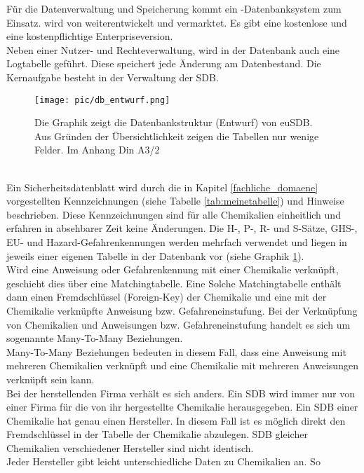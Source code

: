 Für die Datenverwaltung und Speicherung kommt ein -Datenbanksystem
zum Einsatz.  wird von  weiterentwickelt und vermarktet.
Es gibt eine kostenlose und eine kostenpflichtige
Enterpriseversion. \cite{ORACOR-2013}
\\
Neben einer Nutzer- und Rechteverwaltung, wird in der Datenbank auch eine
Logtabelle geführt. Diese speichert jede Änderung am Datenbestand. Die
Kernaufgabe besteht in der Verwaltung der \ac{SDB}.
\begin{figure}
  \centering
    \texttt{[image: pic/db\_entwurf.png]}
      \caption[Datenbankstruktur der Plattform euSDB]{Die Graphik zeigt die
      Datenbankstruktur (Entwurf) von euSDB.
      Aus Gründen der Übersichtlichkeit zeigen die Tabellen nur wenige Felder. Im Anhang Din A3/2}
      \label{fig:db_entwurf}
\end{figure}
\\
Ein Sicherheitsdatenblatt wird durch die in Kapitel \ref{fachliche_domaene}
vorgestellten Kennzeichnungen (siehe Tabelle \ref{tab:meinetabelle}) und
Hinweise beschrieben. Diese Kennzeichnungen sind für alle Chemikalien einheitlich und
erfahren in absehbarer Zeit keine Änderungen. Die H-, P-, R- und S-Sätze,
GHS-, EU- und Hazard-Gefahrenkennungen werden mehrfach
verwendet und liegen in jeweils einer eigenen Tabelle in der Datenbank
vor (siehe Graphik \ref{fig:db_entwurf}).
\\
Wird eine Anweisung oder Gefahrenkennung mit einer Chemikalie verknüpft,
geschieht dies über eine Matchingtabelle. Eine Solche Matchingtabelle enthält
dann einen Fremdschlüssel (Foreign-Key) der Chemikalie und eine mit der
Chemikalie verknüpfte Anweisung bzw. Gefahreneinstufung. Bei der Verknüpfung
von Chemikalien und Anweisungen bzw. Gefahreneinstufung handelt es sich um
sogenannte Many-To-Many Beziehungen.
\\
Many-To-Many Beziehungen bedeuten in diesem Fall, dass eine Anweisung mit
mehreren Chemikalien verknüpft und eine Chemikalie mit mehreren
Anweisungen verknüpft sein kann.
\\
Bei der herstellenden Firma verhält es sich anders. Ein \ac{SDB}
wird immer nur von einer Firma für die von ihr hergestellte Chemikalie
herausgegeben. Ein \ac{SDB} einer Chemikalie hat genau einen Hersteller. In
diesem Fall ist es möglich direkt den Fremdschlüssel in der Tabelle der
Chemikalie abzulegen. \ac{SDB} gleicher Chemikalien
verschiedener Hersteller sind nicht identisch.
\\
Jeder Hersteller gibt leicht unterschiedliche Daten zu Chemikalien an. So
